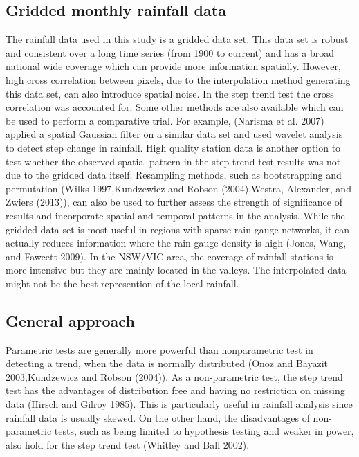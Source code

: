 \documentclass[fleqn,10pt,lineno]{wlpeerj} %
\begin{document}
\subsection{Gridded monthly rainfall
data}\label{gridded-monthly-rainfall-data}

The rainfall data used in this study is a gridded data set. This data
set is robust and consistent over a long time series (from 1900 to
current) and has a broad national wide coverage which can provide more
information spatially. However, high cross correlation between pixels,
due to the interpolation method generating this data set, can also
introduce spatial noise. In the step trend test the cross correlation
was accounted for. Some other methods are also available which can be
used to perform a comparative trial. For example, (Narisma et al. 2007)
applied a spatial Gaussian filter on a similar data set and used wavelet
analysis to detect step change in rainfall. High quality station data is
another option to test whether the observed spatial pattern in the step
trend test results was not due to the gridded data itself. Resampling
methods, such as bootstrapping and permutation (Wilks 1997,Kundzewicz
and Robson (2004),Westra, Alexander, and Zwiers (2013)), can also be
used to further assess the strength of significance of results and
incorporate spatial and temporal patterns in the analysis. While the
gridded data set is most useful in regions with sparse rain gauge
networks, it can actually reduces information where the rain gauge
density is high (Jones, Wang, and Fawcett 2009). In the NSW/VIC area,
the coverage of rainfall stations is more intensive but they are mainly
located in the valleys. The interpolated data might not be the best
represention of the local rainfall.

\subsection{General approach}\label{general-approach}

Parametric tests are generally more powerful than nonparametric test in
detecting a trend, when the data is normally distributed (Onoz and
Bayazit 2003,Kundzewicz and Robson (2004)). As a non-parametric test,
the step trend test has the advantages of distribution free and having
no restriction on missing data (Hirsch and Gilroy 1985). This is
particularly useful in rainfall analysis since rainfall data is usually
skewed. On the other hand, the disadvantages of non-parametric tests,
such as being limited to hypothesis testing and weaker in power, also
hold for the step trend test (Whitley and Ball 2002).
\end{document}
